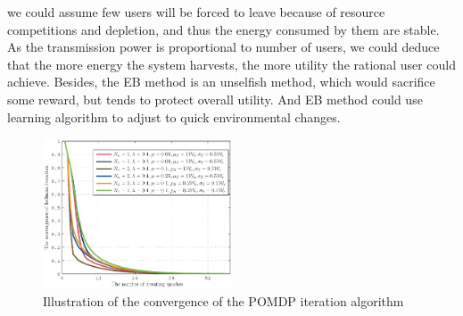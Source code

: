 \documentclass[conference]{IEEEtran}
\begin{document}
we could assume few users will be forced to leave because of resource competitions and depletion,
and thus the energy consumed by them are stable.
As the transmission power is proportional to number of users,
we could deduce that the more energy the system harvests,
the more utility the rational user could achieve.
Besides, the EB method is an unselfish method, which would sacrifice some reward,
but tends to protect overall utility.
And EB method could use learning algorithm to adjust to quick environmental changes.
\begin{figure}[t]
\centering
\includegraphics[width=0.5\textwidth]{2_fig3.eps}
\caption{Illustration of the convergence of the POMDP iteration algorithm}
\end{figure}
\end{document}
